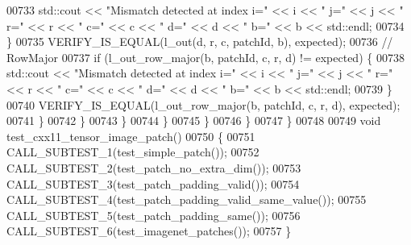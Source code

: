 \begin{DoxyCode}
00733                 std::cout << \textcolor{stringliteral}{"Mismatch detected at index i="} << i << \textcolor{stringliteral}{" j="} << j << \textcolor{stringliteral}{" r="} << r << \textcolor{stringliteral}{" c="} << c
       << \textcolor{stringliteral}{" d="} << d << \textcolor{stringliteral}{" b="} << b << std::endl;
00734               \}
00735               VERIFY\_IS\_EQUAL(l\_out(d, r, c, patchId, b), expected);
00736               \textcolor{comment}{// RowMajor}
00737               \textcolor{keywordflow}{if} (l\_out\_row\_major(b, patchId, c, r, d) != expected) \{
00738                 std::cout << \textcolor{stringliteral}{"Mismatch detected at index i="} << i << \textcolor{stringliteral}{" j="} << j << \textcolor{stringliteral}{" r="} << r << \textcolor{stringliteral}{" c="} << c
       << \textcolor{stringliteral}{" d="} << d << \textcolor{stringliteral}{" b="} << b << std::endl;
00739               \}
00740               VERIFY\_IS\_EQUAL(l\_out\_row\_major(b, patchId, c, r, d), expected);
00741             \}
00742           \}
00743         \}
00744       \}
00745     \}
00746   \}
00747 \}
00748 
00749 \textcolor{keywordtype}{void} test\_cxx11\_tensor\_image\_patch()
00750 \{
00751   CALL\_SUBTEST\_1(test\_simple\_patch());
00752   CALL\_SUBTEST\_2(test\_patch\_no\_extra\_dim());
00753   CALL\_SUBTEST\_3(test\_patch\_padding\_valid());
00754   CALL\_SUBTEST\_4(test\_patch\_padding\_valid\_same\_value());
00755   CALL\_SUBTEST\_5(test\_patch\_padding\_same());
00756   CALL\_SUBTEST\_6(test\_imagenet\_patches());
00757 \}
\end{DoxyCode}
